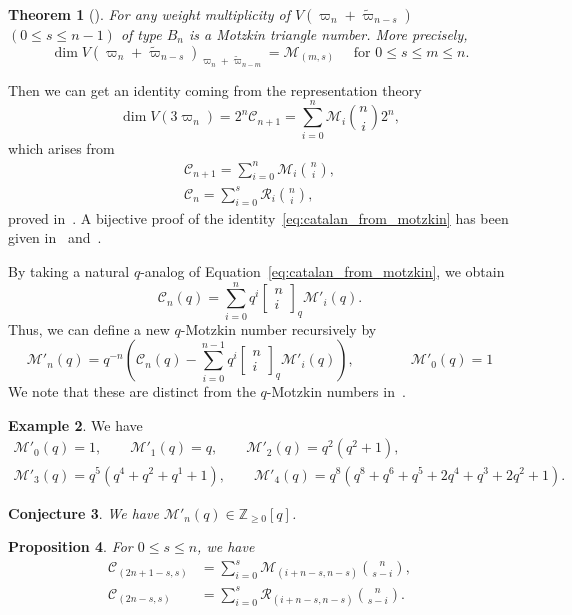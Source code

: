 \documentclass[11pt, leqno]{amsart}
\theoremstyle{plain}
\newtheorem{theorem}{Theorem}[section]
\newtheorem{proposition}[theorem]{Proposition}
\newtheorem{conjecture}[theorem]{Conjecture}
\theoremstyle{definition}
\newtheorem{example}[theorem]{Example}
\numberwithin{equation}{section}
\newcommand{\fw}{\varpi} %
\newcommand{\tfw}{\widetilde{\fw}} %
\newcommand{\Cat}{\mathcal{C}} %
\newcommand{\Mot}{\mathcal{M}} %
\newcommand{\Rior}{\mathcal{R}} %
\newcommand{\qbinom}[3]{\left[ \begin{matrix} #1 \\ #2 \end{matrix} \right]_{#3}} %
\newcommand{\Z}{\mathbb{Z}}
\begin{document}
\begin{theorem}[{\cite{KLO17}}]
\label{thm: wt Motzkin}
For any weight multiplicity of $V(\fw_n+\tfw_{n-s})$ $(0\le s \le n-1)$ of type $B_n$ is a Motzkin triangle number. More precisely,
\[
\dim V(\fw_n+\tfw_{n-s})_{\fw_n+\tfw_{n-m}} = \Mot_{(m,s)} \quad \text{ for } 0 \le s\le m \le n.
\]
\end{theorem}
Then we can get an identity coming from the representation theory
\[
\dim V(3\fw_n) = 2^n \Cat_{n+1}  = \sum_{i=0}^n \Mot_i \binom{n}{i}2^{n},
\]
which arises from
\begin{subequations}
\begin{align}
\Cat_{n+1} = \sum_{i=0}^n \Mot_i \binom{n}{i}, \label{eq:catalan_from_motzkin} \\
\Cat_n = \sum_{i=0}^s \Rior_i\binom{n}{i}, \label{eq:catalan_from_riordan}
\end{align}
\end{subequations}
proved in~\cite[Sec.~5]{Bernhart97}. A bijective proof of the identity~\eqref{eq:catalan_from_motzkin} has been given in~\cite{Donaghey77} and~\cite[Sec.~3]{DY08}.

By taking a natural $q$-analog of Equation~\eqref{eq:catalan_from_motzkin}, we obtain
\[
\Cat_n(q) = \sum_{i=0}^n q^i \qbinom{n}{i}{q} \Mot'_i(q).
\]
Thus, we can define a new $q$-Motzkin number recursively by
\[
\Mot'_n(q) = q^{-n} \left( \Cat_n(q) - \sum_{i=0}^{n-1} q^i \qbinom{n}{i}{q} \Mot'_i(q) \right),
\qquad\qquad \Mot'_0(q) = 1
\]
We note that these are distinct from the $q$-Motzkin numbers in~\cite{BDLFP98,Cigler99}.

\begin{example}
We have
\begin{gather*}
\Mot'_0(q) = 1,
\qquad
\Mot'_1(q) = q,
\qquad
\Mot'_2(q) = q^2 (q^2 + 1),
\\
\Mot'_3(q) = q^5(q^4 + q^2 + q^1 + 1),
\qquad
\Mot'_4(q) = q^8(q^8 + q^6 + q^5 + 2 q^4 + q^3 + 2 q^2 + 1).
\end{gather*}
\end{example}

\begin{conjecture}
\label{conj:q_natural_motzkin}
We have $\Mot'_n(q) \in \Z_{\geq 0}[q]$.
\end{conjecture}


\begin{proposition}
For $0 \le s \le n$, we have
\begin{subequations} \label{eq:tri_Catalan_from_another triangles}
\begin{align}
\Cat_{(2n+1-s,s)} & = \sum_{i=0}^s \Mot_{(i+n-s,n-s)}\binom{n}{s-i}, \label{eq:tri_Catalan_from_Motzkin} \\
\Cat_{(2n-s,s)} & = \sum_{i=0}^s \Rior_{(i+n-s,n-s)}\binom{n}{s-i}. \label{eq:tri_Catalan_from_Riordan}
\end{align}
\end{subequations}
\end{proposition}
\end{document}
